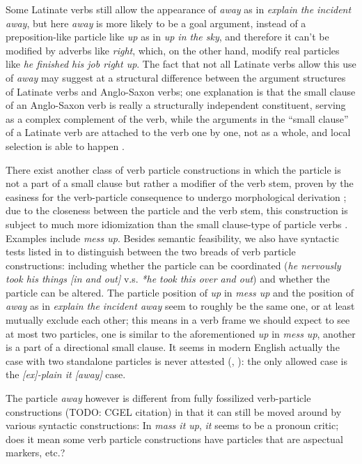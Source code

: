 \documentclass[UTF8, a4paper, oneside, scheme=plain, 12pt]{ctexbook}
\newcommand*{\citepage}[1]{p.~{#1}}
\newcommand{\form}[1]{\emph{#1}}
\begin{document}
Some Latinate verbs still allow the appearance of \form{away} 
as in \form{explain the incident away}, 
but here \form{away} is more likely to be a goal argument, 
instead of a preposition-like particle like \form{up} as in \form{up in the sky}, 
and therefore it can't be modified by adverbs like \form{right},
which, on the other hand, modify real particles like \form{he finished his job right up}.
The fact that not all Latinate verbs allow this use of \form{away} 
may suggest at a structural difference between the argument structures 
of Latinate verbs and Anglo-Saxon verbs;
one explanation is that the small clause of an Anglo-Saxon verb 
is really a structurally independent constituent, 
serving as a complex complement of the verb, 
while the arguments in the ``small clause'' of a Latinate verb 
are attached to the verb one by one, not as a whole, 
and local selection is able to happen \citep{punske2013three}.

There exist another class of verb particle constructions in which 
the particle is not a part of a small clause
but rather a modifier of the verb stem,
proven by the easiness for the verb-particle consequence 
to undergo morphological derivation \citep{farrell2005english};
due to the closeness between the particle and the verb stem, 
this construction is subject to much more idiomization than 
the small clause-type of particle verbs
\citep{wurmbrand2000structure}.
Examples include \form{mess up}.
Besides semantic feasibility, 
we also have syntactic tests listed in \citet{wurmbrand2000structure} to distinguish 
between the two breads of verb particle constructions:
including whether the particle can be coordinated 
(\form{he nervously took his things [in and out]} 
v.s. \form{*he took this over and out})
and whether the particle can be altered.
The particle position of \form{up} in \form{mess up} 
and the position of \form{away} as in \form{explain the incident away}
seem to roughly be the same one, 
or at least mutually exclude each other; 
this means in a verb frame we should expect to see at most two particles, 
one is similar to the aforementioned \form{up} in \form{mess up},
another is a part of a directional small clause.
It seems in modern English actually the case with two standalone particles 
is never attested (\citealt[\citepage{293}]{dixon2005semantic}, \citealt[\citepage{286}]{cgel}):  
the only allowed case is the \form{[ex]-plain it [away]} case.

The particle \form{away} however is different from fully fossilized verb-particle constructions 
(TODO: CGEL citation) in that it can still be moved around by various syntactic constructions:
In \form{mass it up}, \form{it} seems to be a pronoun critic;
does it mean some verb particle constructions have particles that are aspectual markers, etc.?
\end{document}
